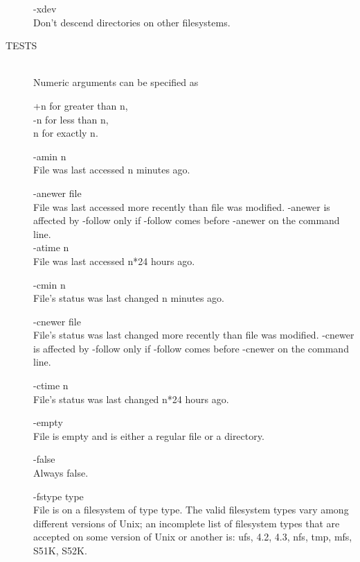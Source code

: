 \begin{description}
       -xdev   \\
              Don't descend directories on other filesystems.

\item[TESTS] \hfill \\
       Numeric arguments can be specified as

       +n     for greater than n, \\

       -n     for less than n, \\

       n      for exactly n.

       -amin n \\
              File was last accessed n minutes ago.

       -anewer file \\
              File was last accessed more recently than file  was
              modified.   -anewer  is affected by -follow only if
              -follow comes before -anewer on the command line. \\

       -atime n \\
              File was last accessed n*24 hours ago.

       -cmin n \\
              File's status was last changed n minutes ago.

       -cnewer file \\
              File's status was last changed more  recently  than
              file  was modified.  -cnewer is affected by -follow
              only if -follow comes before -cnewer on the command
              line.

       -ctime n \\
              File's status was last changed n*24 hours ago.

       -empty  \\
              File  is  empty  and  is either a regular file or a
              directory.

       -false  \\
              Always false.

       -fstype type \\
              File is on a filesystem of type  type.   The  valid
              filesystem  types  vary among different versions of
              Unix; an incomplete list of filesystem  types  that
              are accepted on some version of Unix or another is:
              ufs, 4.2, 4.3, nfs, tmp, mfs, S51K, S52K.


\end{description}
